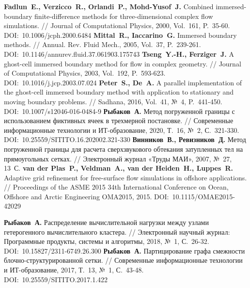 \begin{thebibliography}{99}
\textbf{Fadlun~E., Verzicco~R., Orlandi~P., Mohd-Yusof~J.} Combined immersed-boundary finite-difference methods for three-dimensional complex flow simulations. // Journal of Computational Physics, 2000, Vol.~161, P.~35-60. DOI:~10.1006/jcph.2000.6484
\textbf{Mittal~R., Iaccarino~G.} Immersed boundary methods. // Annual. Rev. Fluid Mech., 2005, Vol.~37, P.~239-261. DOI:~10.1146/annurev.fluid.37.061903.175743
\textbf{Tseng~Y.-H., Ferziger~J.} A ghost-cell immersed boundary method for flow in complex geometry. // Journal of Computational Physics, 2003, Vol.~192, P.~593-623. DOI:~10.1016/j.jcp.2003.07.024
\textbf{Peter~S., De~A.} A parallel implementation of the ghost-cell immersed boundary method with application to stationary and moving boundary problems. // Sadhana, 2016, Vol.~41, №~4, P.~441-450. DOI:~10.1007/s12046-016-0484-9
\textbf{Рыбаков~А.} Метод погруженной границы с использованием фиктивных ячеек в трехмерной постановке. // Современные информационные технологии и ИТ-образование, 2020, Т.~16, №~2, С.~321-330. DOI:~10.25559/SITITO.16.202002.321-330
\textbf{Винников~В., Ревизников~Д.} Метод погруженной границы для расчета сверхзвукового обтекания затупленных тел на прямоугольных сетках. // Электронный журнал «Труды МАИ», 2007, №~27, 13~С.
\textbf{van der Plas~P., Veldman~A., van der Heiden~H., Luppes~R.} Adaptive grid refinement for free-surface flow simulations in offshore applications. // Proceedings of the ASME 2015 34th International Conference on Ocean, Offshore and Arctic Engineering OMA2015, 2015. DOI:~10.1115/OMAE2015-42029



\textbf{Рыбаков~А.} Распределение вычислительной нагрузки между узлами гетерогенного вычислительного кластера. // Электронный научный журнал: Программные продукты, системы и алгоритмы, 2018, №~1, С.~26-32. DOI:~10.15827/2311-6749.26.300
\textbf{Рыбаков~А.} Партицирование графа смежности блочно-структурированной сетки. // Современные информационные технологии и ИТ-образование, 2017, Т.~13, №~1, С.~43-48. DOI:~10.25559/SITITO.2017.1.422


\end{thebibliography}
